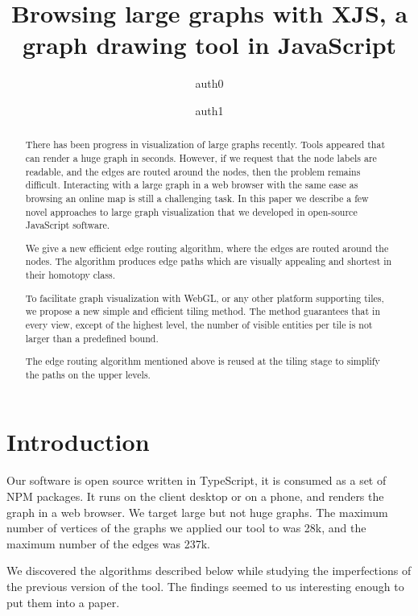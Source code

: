 \documentclass{gd-llncs}
\begin{document}
\title{Browsing large graphs with XJS, a graph drawing tool in JavaScript }
\author{%
  auth0  \and
  auth1
}%
\maketitle

\begin{abstract}
  There has been progress in visualization of large graphs recently. Tools appeared that can render a huge graph in seconds. However, if we request that the node labels are readable, and the edges are routed around the nodes, then the problem remains difficult. Interacting with a large graph in a web browser with the same ease as browsing an online map is still a challenging task.
  In this paper we describe a few novel approaches to large graph visualization that we developed in open-source JavaScript software.

  We give a new efficient edge routing algorithm, where the edges are routed around the nodes. The algorithm produces edge paths which are visually appealing and shortest in their homotopy class.

  To facilitate graph visualization with WebGL, or any other platform supporting tiles, we propose a new simple and efficient tiling method. The method guarantees that in every view, except of the highest level, the number of visible entities per tile is not larger than a predefined bound.

  The edge routing algorithm mentioned above is reused at the tiling stage to simplify the paths on the upper levels.
\end{abstract}


\section*{Introduction}

\label{sec:intro}
Our software is open source written in TypeScript, it is consumed as a set of NPM packages.
It runs on the client desktop or on a phone, and renders the graph in a web browser.
We target large but not huge graphs. The maximum number of vertices of the graphs we applied our tool to was 28k,
and the maximum number of the edges was 237k.

We discovered the algorithms described below while studying the imperfections of the previous version of the tool. The findings seemed to us interesting enough to put them into a paper.
\end{document}
